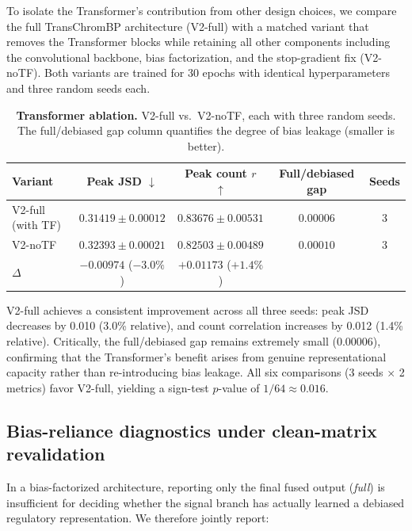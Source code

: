 \documentclass[11pt,a4paper]{article}
\begin{document}
To isolate the Transformer's contribution from other design choices, we
compare the full TransChromBP architecture (V2-full) with a matched
variant that removes the Transformer blocks while retaining all other
components including the convolutional backbone, bias factorization, and
the stop-gradient fix (V2-noTF). Both variants are trained for 30 epochs
with identical hyperparameters and three random seeds each.

\begin{table}[H]
\centering
\small
\caption{\textbf{Transformer ablation.} V2-full vs.\ V2-noTF, each with
three random seeds. The full/debiased gap column quantifies the degree
of bias leakage (smaller is better).}
\label{tab:tf-ablation}
\begin{tabular}{lcccc}
\toprule
Variant & Peak JSD $\downarrow$ & Peak count $r$ $\uparrow$
  & Full/debiased gap & Seeds \\
\midrule
V2-full (with TF)
  & $\mathbf{0.31419 \pm 0.00012}$ & $\mathbf{0.83676 \pm 0.00531}$
  & $0.00006$ & 3 \\
V2-noTF
  & $0.32393 \pm 0.00021$ & $0.82503 \pm 0.00489$
  & $0.00010$ & 3 \\
\midrule
$\Delta$ & $-0.00974$ ($-3.0\%$) & $+0.01173$ ($+1.4\%$) & & \\
\bottomrule
\end{tabular}
\end{table}

\noindent V2-full achieves a consistent improvement across all three
seeds: peak JSD decreases by 0.010 (3.0\% relative), and count
correlation increases by 0.012 (1.4\% relative). Critically, the
full/debiased gap remains extremely small (0.00006), confirming that the
Transformer's benefit arises from genuine representational capacity
rather than re-introducing bias leakage. All six comparisons (3 seeds
$\times$ 2 metrics) favor V2-full, yielding a sign-test $p$-value of
$1/64 \approx 0.016$.

\subsection{Bias-reliance diagnostics under clean-matrix revalidation}
\label{sec:shortcut}

In a bias-factorized architecture, reporting only the final fused output
(\emph{full}) is insufficient for deciding whether the signal branch has
actually learned a debiased regulatory representation. We therefore
jointly report:
\end{document}
